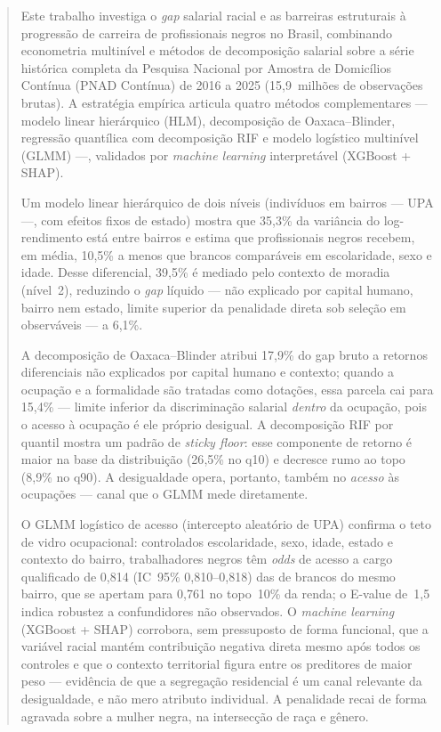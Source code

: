 \documentclass[12pt, a4paper, oneside]{article}
\begin{document}
\begin{abstract}
\noindent
Este trabalho investiga o \textit{gap} salarial racial e as barreiras estruturais
à progressão de carreira de profissionais negros no Brasil, combinando econometria
multinível e métodos de decomposição salarial sobre a série histórica completa da
Pesquisa Nacional por Amostra de Domicílios Contínua (PNAD Contínua) de 2016 a 2025
(15{,}9~milhões de observações brutas). A estratégia empírica articula quatro métodos
complementares --- modelo linear hierárquico (HLM), decomposição de Oaxaca--Blinder,
regressão quantílica com decomposição RIF e modelo logístico multinível (GLMM) ---,
validados por \textit{machine learning} interpretável (XGBoost + SHAP).

Um modelo linear hierárquico de dois níveis (indivíduos em bairros --- UPA ---, com
efeitos fixos de estado) mostra que 35,3\% da variância do log-rendimento está
entre bairros e estima que profissionais negros recebem, em média, 10,5\% a menos
que brancos comparáveis em escolaridade, sexo e idade. Desse diferencial, 39,5\%
é mediado pelo contexto de moradia (nível~2), reduzindo o \textit{gap} líquido --- não
explicado por capital humano, bairro nem estado, limite superior da penalidade
direta sob seleção em observáveis --- a 6,1\%.

A decomposição de Oaxaca--Blinder atribui 17,9\% do gap bruto a retornos
diferenciais não explicados por capital humano e contexto; quando a ocupação e a
formalidade são tratadas como dotações, essa parcela cai para 15,4\% ---
limite inferior da discriminação salarial \emph{dentro} da ocupação, pois o acesso
à ocupação é ele próprio desigual. A decomposição RIF por quantil mostra um padrão de
\textit{sticky floor}: esse componente de retorno é maior na base da distribuição
(26{,}5\% no q10) e decresce rumo ao topo (8{,}9\% no q90). A desigualdade opera,
portanto, também no \emph{acesso} às ocupações --- canal que o GLMM mede diretamente.

O GLMM logístico de acesso (intercepto aleatório de UPA) confirma o teto de vidro
ocupacional: controlados escolaridade, sexo, idade, estado e contexto do bairro,
trabalhadores negros têm \textit{odds} de acesso a cargo qualificado de 0,814
(IC~95\% 0,810--0,818) das de brancos do mesmo bairro, que se apertam para
0,761 no topo~10\% da renda; o E-value de~1,5 indica robustez a
confundidores não observados.
O \textit{machine learning} (XGBoost + SHAP) corrobora, sem pressuposto de forma
funcional, que a variável racial mantém contribuição negativa direta mesmo após todos
os controles e que o contexto territorial figura entre os preditores de maior peso ---
evidência de que a segregação residencial é um canal relevante da desigualdade, e não
mero atributo individual. A penalidade recai de forma agravada sobre a mulher negra,
na intersecção de raça e gênero.


\end{abstract}
\end{document}
